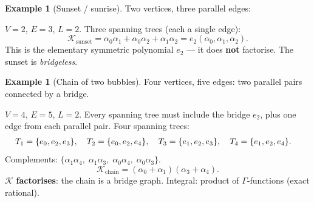 \documentclass[11pt,a4paper]{article}
\theoremstyle{definition}
\newtheorem{example}[theorem]{Example}
\newcommand{\K}{\mathcal{K}}
\begin{document}
\begin{example}[Sunset / sunrise]
\label{ex:sunset}
Two vertices, three parallel edges:

\begin{center}
\end{center}

$V = 2$, $E = 3$, $L = 2$. Three spanning trees (each a single edge):
\begin{equation}
\K_{\text{sunset}} = \alpha_0\alpha_1 + \alpha_0\alpha_2 + \alpha_1\alpha_2
= e_2(\alpha_0, \alpha_1, \alpha_2).
\end{equation}
This is the elementary symmetric polynomial $e_2$ --- it does
\textbf{not} factorise. The sunset is \emph{bridgeless}.
\end{example}

\begin{example}[Chain of two bubbles]
\label{ex:chain}
Four vertices, five edges: two parallel pairs connected by a bridge.

\begin{center}
\end{center}

$V = 4$, $E = 5$, $L = 2$. Every spanning tree must include the bridge
$e_2$, plus one edge from each parallel pair.
Four spanning trees:
\begin{align}
&T_1 = \{e_0, e_2, e_3\}, \quad
T_2 = \{e_0, e_2, e_4\}, \quad
T_3 = \{e_1, e_2, e_3\}, \quad
T_4 = \{e_1, e_2, e_4\}. \notag
\end{align}
Complements: $\{\alpha_1\alpha_4,\; \alpha_1\alpha_3,\;
\alpha_0\alpha_4,\; \alpha_0\alpha_3\}$.
\begin{equation}
\K_{\text{chain}} = (\alpha_0 + \alpha_1)(\alpha_3 + \alpha_4).
\end{equation}
$\K$ \textbf{factorises}: the chain is a bridge graph.
Integral: product of $\Gamma$-functions (exact rational).
\end{example}
\end{document}
